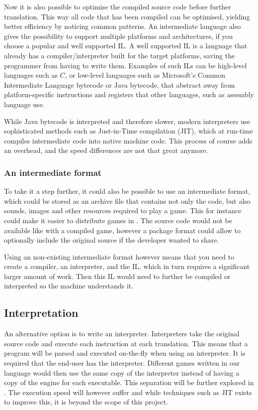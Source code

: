 

Now it is also possible to optimise the compiled source code before
further translation. This way all
code that has been compiled can be optimised, yielding better
efficiency by noticing common patterns. An intermediate language also
gives the possibility to support multiple platforms and architectures,
if you choose a popular and well supported IL. A well supported IL is a
language that already has a compiler/interpreter built for the target
platforms, saving the programmer from having to write them. Examples
of such ILs can be high-level languages such as $C$, or low-level
languages such as Microsoft's Common Intermediate Language bytecode or
Java bytecode, that abstract away from platform-specific instructions and
registers that other languages, such as assembly language use.

While Java bytecode is interpreted and therefore slower, modern interpreters
use sophisticated methods such as Just-in-Time compilation (JIT), which at
run-time compiles intermediate code into native machine code. This process of
course adds an overhead, and the speed differences are not that great
anymore\cite{java-speed}.

\subsubsection{An intermediate format}
To take it a step further, it could also be possible to use an
intermediate format, which could be stored as an archive file that
contains not only the code, but also sounds, images and other resources
required to play a game. This for instance could make it easier to
distribute games in \productname{}. The source code would not be
available like with a compiled game, however a package format could
allow to optionally include the original source if the developer wanted
to share.

Using an non-existing intermediate format however means that you need to
create a compiler, an interpreter, and the IL, which in turn requires a
significant larger amount of work. Then this IL would need to further be
compiled or interpreted so the machine understands it.

\subsection{Interpretation}
\label{sec:interpretation}
An alternative option is to write an interpreter. Interpreters take the
original source code and execute each instruction at each translation.
This means that a program will be parsed and executed on-the-fly
when using an interpreter. It is required that the end-user has the
interpreter. Different games written in our language would then use
the same copy of the interpreter instead of having a copy of the
engine for each executable. This separation will be further explored
in . The execution speed will however
suffer and while techniques such as JIT exists to improve this, it is
beyond the scope of this project.


